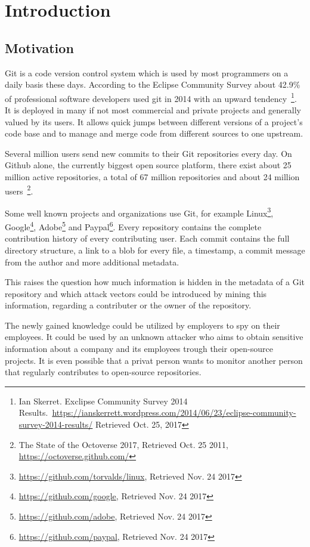 \chapter{Introduction}
\section{Motivation}

Git is a code version control system which is used by most programmers on a daily basis these days. According to the Eclipse Community Survey about 42.9\% of professional software developers used git in 2014 with an upward tendency~\footnote{Ian Skerret. Exclipse Community Survey 2014 Results.\ \url{https://ianskerrett.wordpress.com/2014/06/23/eclipse-community-survey-2014-results/} Retrieved Oct. 25, 2017}.
It is deployed in many if not most commercial and private projects and generally valued by its users. It allows quick jumps between different versions of a project's code base and to manage and merge code from different sources to one upstream.

Several million users send new commits to their Git repositories every day.
On Github alone, the currently biggest open source platform, there exist about 25 million active repositories, a total of 67 million repositories and about 24 million users~\footnote{The State of the Octoverse 2017, Retrieved Oct. 25 2011, \url{https://octoverse.github.com/}}.

Some well known projects and organizations use Git, for example Linux\footnote{\url{https://github.com/torvalds/linux}, Retrieved Nov. 24 2017}, Google\footnote{\url{https://github.com/google}, Retrieved Nov. 24 2017}, Adobe\footnote{\url{https://github.com/adobe}, Retrieved Nov. 24 2017} and Paypal\footnote{\url{https://github.com/paypal}, Retrieved Nov. 24 2017}.
Every repository contains the complete contribution history of every contributing user.
Each commit contains the full directory structure, a link to a blob for every file, a timestamp, a commit message from the author and more additional metadata.

This raises the question how much information is hidden in the metadata of a Git repository and which attack vectors could be introduced by mining this information, regarding a contributer or the owner of the repository.

The newly gained knowledge could be utilized by employers to spy on their employees.
It could be used by an unknown attacker who aims to obtain sensitive information about a company and its employees trough their open-source projects.
It is even possible that a privat person wants to monitor another person that regularly contributes to open-source repositories.


